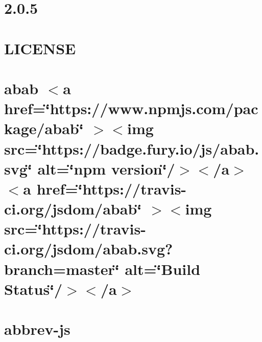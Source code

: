 \documentclass[twoside]{book}
\newcommand{\+}{\discretionary{\mbox{\scriptsize$\hookleftarrow$}}{}{}}
\begin{document}
\chapter{2.0.5}
\label{md__c___users_vaishnavi_jadhav__desktop__developer_code_mean_stack_example_client_node_modules_abab__c_h_a_n_g_e_l_o_g}

\chapter{LICENSE}
\label{md__c___users_vaishnavi_jadhav__desktop__developer_code_mean_stack_example_client_node_modules_abab__l_i_c_e_n_s_e}

\chapter{abab \texorpdfstring{$<$}{<}a href=\char`\"{}https\+://www.\+npmjs.\+com/package/abab\char`\"{} \texorpdfstring{$>$}{>}\texorpdfstring{$<$}{<}img src=\char`\"{}https\+://badge.\+fury.\+io/js/abab.\+svg\char`\"{} alt=\char`\"{}npm version\char`\"{}/\texorpdfstring{$>$}{>}\texorpdfstring{$<$}{<}/a\texorpdfstring{$>$}{>} \texorpdfstring{$<$}{<}a href=\char`\"{}https\+://travis-\/ci.\+org/jsdom/abab\char`\"{} \texorpdfstring{$>$}{>}\texorpdfstring{$<$}{<}img src=\char`\"{}https\+://travis-\/ci.\+org/jsdom/abab.\+svg?branch=master\char`\"{} alt=\char`\"{}\+Build Status\char`\"{}/\texorpdfstring{$>$}{>}\texorpdfstring{$<$}{<}/a\texorpdfstring{$>$}{>}}
\label{md__c___users_vaishnavi_jadhav__desktop__developer_code_mean_stack_example_client_node_modules_abab__r_e_a_d_m_e}

\chapter{abbrev-\/js}
\label{md__c___users_vaishnavi_jadhav__desktop__developer_code_mean_stack_example_client_node_modules_abbrev__r_e_a_d_m_e}

\end{document}
